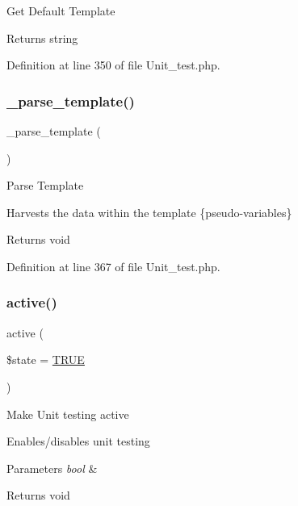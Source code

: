 Get Default Template

\begin{DoxyReturn}{Returns}
string 
\end{DoxyReturn}


Definition at line 350 of file Unit\+\_\+test.\+php.

\mbox{\label{class_c_i___unit__test_a884e99b431f75c1ad17ba9753dab3b49}} 
\subsubsection{\texorpdfstring{\_parse\_template()}{\_parse\_template()}}
{\footnotesize\ttfamily \+\_\+parse\+\_\+template (\begin{DoxyParamCaption}{ }\end{DoxyParamCaption})\hspace{0.3cm}{\ttfamily [protected]}}

Parse Template

Harvests the data within the template \{pseudo-\/variables\}

\begin{DoxyReturn}{Returns}
void 
\end{DoxyReturn}


Definition at line 367 of file Unit\+\_\+test.\+php.

\mbox{\label{class_c_i___unit__test_ac7b3030630fc7dd31513c75cf27c1a8a}} 
\subsubsection{\texorpdfstring{active()}{active()}}
{\footnotesize\ttfamily active (\begin{DoxyParamCaption}\item[{}]{\$state = {\ttfamily \mbox{\hyperlink{constants_8php_ae04a3efe6aa42044f803ee90c2277846}{T\+R\+UE}}} }\end{DoxyParamCaption})}

Make Unit testing active

Enables/disables unit testing


\begin{DoxyParams}{Parameters}
{\em bool} & \\
\hline
\end{DoxyParams}
\begin{DoxyReturn}{Returns}
void 
\end{DoxyReturn}


